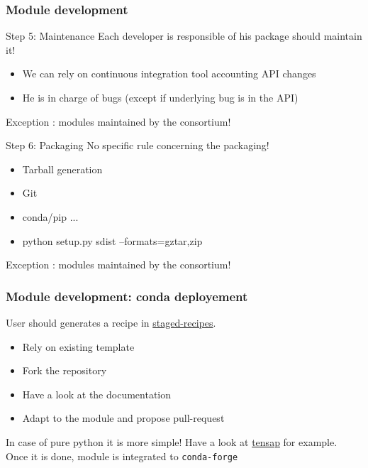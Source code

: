 \documentclass[8pt]{beamer}
\begin{document}
\begin{frame}
  \frametitle{Module development}
  \begin{block}{Step 5: Maintenance}
    Each developer is responsible of his package should maintain it!
    \begin{itemize}
    \item We can rely on continuous integration tool accounting API changes
    \item He is in charge of bugs (except if underlying bug is in the API)
    \end{itemize}
    Exception : modules maintained by the consortium!
  \end{block}
  
  \begin{block}{Step 6: Packaging}
    No specific rule concerning the packaging!
    \begin{itemize}
    \item Tarball generation
    \item Git
    \item conda\slash pip ...
    \item \ttfamily python setup.py sdist --formats=gztar,zip  
    \end{itemize}
    Exception : modules maintained by the consortium!
  \end{block}
\end{frame}

\begin{frame}
  \frametitle{Module development: conda deployement}
  \begin{block}{}
    User should generates a recipe in \href{https://github.com/conda-forge/staged-recipes}{staged-recipes}.
    \begin{itemize}
    \item Rely on existing template
    \item Fork the repository
    \item Have a look at the documentation
    \item Adapt to the module and propose pull-request
    \end{itemize}
    In case of pure python it is more simple! Have a look at \href{https://github.com/conda-forge/staged-recipes/pull/14533}{tensap} for example.\\
    Once it is done, module is integrated to \texttt{conda-forge}
  \end{block}
\end{frame}
\end{document}
